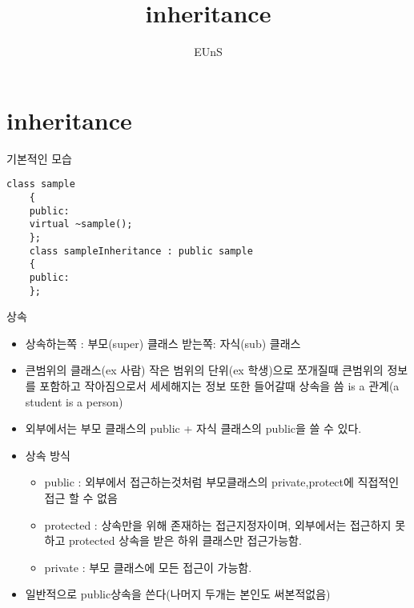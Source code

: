 \documentclass[10pt]{beamer}
\title{inheritance}
\author{EUnS}
\begin{document}
\begin{frame}{}
    \maketitle
\end{frame}    

\begin{frame}{}
    \tableofcontents
\end{frame}   

\section{inheritance}


\begin{frame}[fragile]{기본적인 모습}
    \begin{lstlisting}[style = CppStyle]
    class sample
    {
    public:
    virtual ~sample();
    };
    class sampleInheritance : public sample
    {
    public:
    };
    \end{lstlisting}
\end{frame}    


\begin{frame}{상속}
    \begin{itemize}
        \item 상속하는쪽 : 부모(super) 클래스 받는쪽: 자식(sub) 클래스
        \item 큰범위의 클래스(ex 사람) 작은 범위의 단위(ex 학생)으로 쪼개질때 큰범위의 정보를 포함하고 작아짐으로서 세세해지는 정보 또한 들어갈때 상속을 씀 is a 관계(a student is a person)
        \item 외부에서는 부모 클래스의 public + 자식 클래스의 public을 쓸 수 있다.
        \item 상속 방식 
        \begin{itemize}
            \item public : 외부에서 접근하는것처럼 부모클래스의 private,protect에 직접적인 접근 할 수 없음
            \item protected : 상속만을 위해 존재하는 접근지정자이며, 외부에서는 접근하지 못하고 protected 상속을 받은 하위 클래스만 접근가능함.
            \item private : 부모 클래스에 모든 접근이 가능함.
        \end{itemize}
        \item 일반적으로 public상속을 쓴다(나머지 두개는 본인도 써본적없음)
    \end{itemize}
\end{frame}
\end{document}
